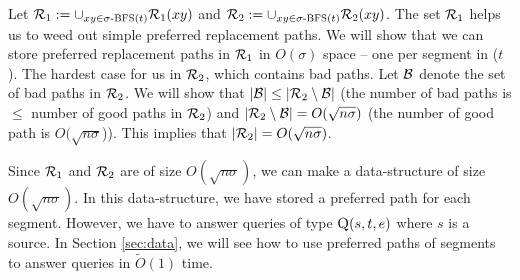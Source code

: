 \noindent Let $\mathcal{R}_1 := \cup_{xy \in \text{$\sigma$-\textsc{BFS}($t$)}} \mathcal{R}_1(xy)$ and
$\mathcal{R}_2 := \cup_{xy \in \text{$\sigma$-\textsc{BFS}($t$)}} \mathcal{R}_2(xy)$. The set  $\mathcal{R}_1$ helps us to weed out
simple preferred replacement paths.
We will show that we can store  preferred replacement paths in  $\mathcal{R}_1$ in
$O(\sigma)$ space --  one per segment in \SBFS($t$).
The hardest case for us in $\mathcal{R}_2$, which contains bad paths.
Let $\mathcal{B}$ denote the set of bad paths in $\mathcal{R}_2$. We will show  that
$|\mathcal{B}| \le |\mathcal{R}_2 \setminus \mathcal{B}|$ (the number of bad paths is $\le$ number of good paths in $\mathcal{R}_2$)
and $|\mathcal{R}_2 \setminus \mathcal{B}| =  O(\sqrt{n\sigma})$ (the number of good path is $ O(\sqrt{n\sigma}$)).
This implies that $|\mathcal{R}_2| =  O(\sqrt{n \sigma})$. %

Since $\mathcal{R}_1$ and $\mathcal{R}_2$ are of size $O(\sqrt{n\sigma})$, we can make a data-structure
of size $O(\sqrt{n\sigma})$.
In this data-structure, we have stored a preferred path for each segment.
However, we have to answer queries of type $\textsc{Q}(s,t,e)$
where $s$ is a source.
In Section \ref{sec:data}, we will see
how to use preferred paths of segments to
answer queries in $\tilde O(1)$ time.
